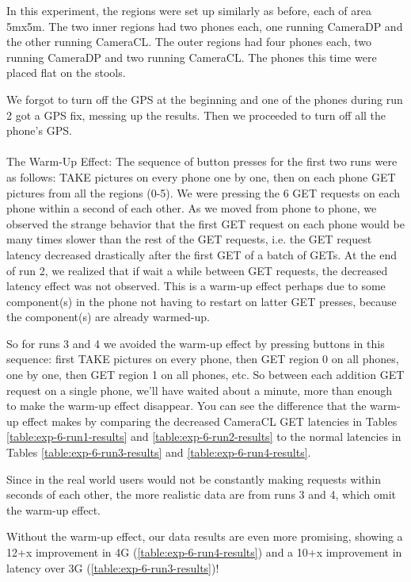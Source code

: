 In this experiment, the regions were set up similarly as before, each of area 5mx5m. The two inner regions had two phones each, one running CameraDP and the other running CameraCL. The outer regions had four phones each, two running CameraDP and two running CameraCL. The phones this time were placed flat on the stools.

We forgot to turn off the GPS at the beginning and one of the phones during run 2 got a GPS fix, messing up the results. Then we proceeded to turn off all the phone's GPS. 
\\
\\
The Warm-Up Effect:
The sequence of button presses for the first two runs were as follows: TAKE pictures on every phone one by one, then on each phone GET pictures from all the regions (0-5). We were pressing the 6 GET requests on each phone within a second of each other. As we moved from phone to phone, we observed the strange behavior that the first GET request on each phone would be many times slower than the rest of the GET requests, i.e. the GET request latency decreased drastically after the first GET of a batch of GETs. At the end of run 2, we realized that if wait a while between GET requests, the decreased latency effect was not observed.  This is a warm-up effect perhaps due to some component(s) in the phone not having to restart on latter GET presses, because the component(s) are already warmed-up.

So for runs 3 and 4 we avoided the warm-up effect by pressing buttons in this sequence: first TAKE pictures on every phone, then GET region 0 on all phones, one by one, then GET region 1 on all phones, etc. So between each addition GET request on a single phone, we'll have waited about a minute, more than enough to make the warm-up effect disappear.  You can see the difference that the warm-up effect makes by comparing the decreased CameraCL GET latencies in Tables \ref{table:exp-6-run1-results} and \ref{table:exp-6-run2-results} to the normal latencies in Tables \ref{table:exp-6-run3-results} and \ref{table:exp-6-run4-results}. 

Since in the real world users would not be constantly making requests within seconds of each other, the more realistic data are from runs 3 and 4, which omit the warm-up effect.

Without the warm-up effect, our data results are even more promising, showing a 12+x improvement in 4G (\ref{table:exp-6-run4-results}) and a 10+x improvement in latency over 3G (\ref{table:exp-6-run3-results})!